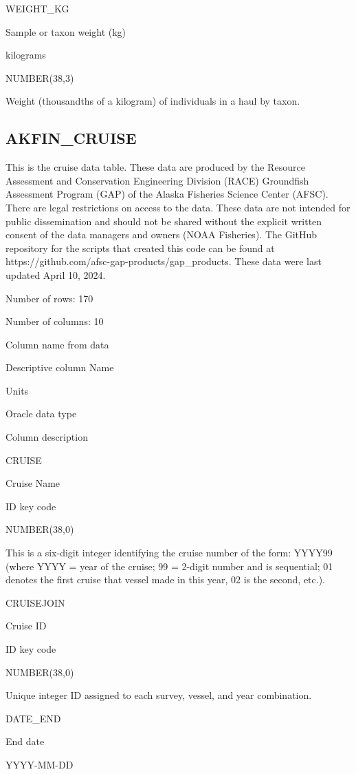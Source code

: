 \documentclass[
  letterpaper,
  oneside,
  open=any]{scrbook}
\begin{document}
WEIGHT\_KG

Sample or taxon weight (kg)

kilograms

NUMBER(38,3)

Weight (thousandths of a kilogram) of individuals in a haul by taxon.

\hypertarget{akfin_cruise}{%
\subsection{AKFIN\_CRUISE}\label{akfin_cruise}}

This is the cruise data table. These data are produced by the Resource
Assessment and Conservation Engineering Division (RACE) Groundfish
Assessment Program (GAP) of the Alaska Fisheries Science Center (AFSC).
There are legal restrictions on access to the data. These data are not
intended for public dissemination and should not be shared without the
explicit written consent of the data managers and owners (NOAA
Fisheries). The GitHub repository for the scripts that created this code
can be found at https://github.com/afsc-gap-products/gap\_products.
These data were last updated April 10, 2024.

Number of rows: 170

Number of columns: 10

Column name from data

Descriptive column Name

Units

Oracle data type

Column description

CRUISE

Cruise Name

ID key code

NUMBER(38,0)

This is a six-digit integer identifying the cruise number of the form:
YYYY99 (where YYYY = year of the cruise; 99 = 2-digit number and is
sequential; 01 denotes the first cruise that vessel made in this year,
02 is the second, etc.).

CRUISEJOIN

Cruise ID

ID key code

NUMBER(38,0)

Unique integer ID assigned to each survey, vessel, and year combination.

DATE\_END

End date

YYYY-MM-DD
\end{document}
